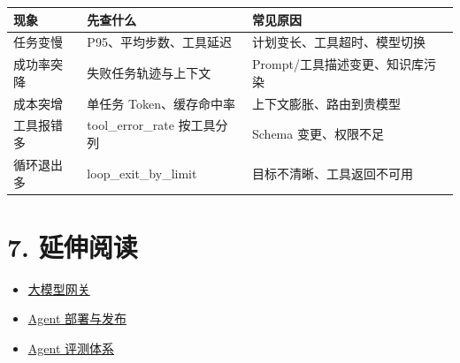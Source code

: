 \documentclass[9pt,a4paper,twocolumn]{ctexart}
\begin{document}
{\footnotesize
\begin{tabular}{|p{}|p{}|p{}|}
\hline
\textbf{现象} & \textbf{先查什么} & \textbf{常见原因} \\
\hline
任务变慢 & P95、平均步数、工具延迟 & 计划变长、工具超时、模型切换 \\
\hline
成功率突降 & 失败任务轨迹与上下文 & Prompt/工具描述变更、知识库污染 \\
\hline
成本突增 & 单任务 Token、缓存命中率 & 上下文膨胀、路由到贵模型 \\
\hline
工具报错多 & tool\_error\_rate 按工具分列 & Schema 变更、权限不足 \\
\hline
循环退出多 & loop\_exit\_by\_limit & 目标不清晰、工具返回不可用 \\
\hline
\end{tabular}
}



\section*{7. 延伸阅读}

\begin{itemize}[itemsep=1pt, topsep=2pt]
  \item \href{04-大模型网关.md}{大模型网关}
  \item \href{06-Agent部署与发布.md}{Agent 部署与发布}
  \item \href{../05-评测与质量/01-Agent评测体系.md}{Agent 评测体系}
\end{itemize}
\end{document}
